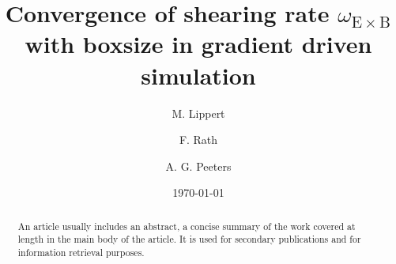 \documentclass[aip, amsmath, amssymb, reprint, twocolumn]{revtex4-1}
\begin{document}

\title[Convergence of shearing rate $\omega_{\mathrm{E}\times\mathrm{B}}$ with boxsize in gradient driven simulation]{
	Convergence of shearing rate $\omega_{\mathrm{E}\times\mathrm{B}}$ with boxsize in gradient driven simulation
}

\author{M. Lippert}
\author{F. Rath}
\author{A. G. Peeters}

\date{\today}


\begin{abstract}
	An article usually includes an abstract, a concise summary of the work
	covered at length in the main body of the article. It is used for
	secondary publications and for information retrieval purposes. 
\end{abstract}

\maketitle


\end{document}
